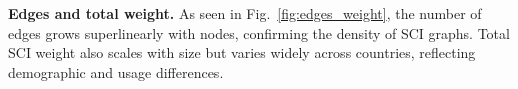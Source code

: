 \textbf{Edges and total weight.}  
As seen in Fig.~\ref{fig:edges_weight}, the number of edges grows superlinearly with nodes, confirming the density of SCI graphs.  
Total SCI weight also scales with size but varies widely across countries, reflecting demographic and usage differences.




\newpage